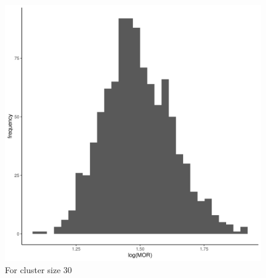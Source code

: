 \documentclass[
  letterpaper,
  DIV=11,
  numbers=noendperiod,
  titlepage]{scrartcl}
\begin{document}
\begin{figure}
\begin{minipage}[t]{0.50\linewidth}
{{\includegraphics{../../plots/two-lvl-ran-int/high-prev/hist_100_30_two_lvl_high_prev.png}

}

\caption{For cluster size 30}

}

\end{minipage}%
%
\begin{minipage}[t]{0.50\linewidth}

{\centering 

}
\end{minipage}
\end{figure}
\end{document}
